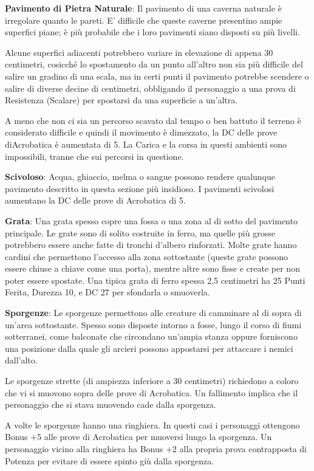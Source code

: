 \documentclass[a4paper,11pt,twoside,openany]{book}
\begin{document}
\textbf{Pavimento di Pietra Naturale}: Il pavimento di una caverna naturale è irregolare quanto le pareti. E' difficile che queste caverne presentino ampie superfici piane; è più probabile che i loro pavimenti siano disposti su più livelli.

Alcune superfici adiacenti potrebbero variare in elevazione di appena 30 centimetri, cosicché lo spostamento da un punto all'altro non sia più difficile del salire un gradino di una scala, ma in certi punti il pavimento potrebbe scendere o salire di diverse decine di centimetri, obbligando il personaggio a una prova di Resistenza (Scalare) per spostarsi da una superficie a un'altra.

A meno che non ci sia un percorso scavato dal tempo o ben battuto il terreno è considerato difficile e quindi il movimento è dimezzato, la DC delle prove diAcrobatica è aumentata di 5. La Carica e la corsa in questi ambienti sono impossibili, tranne che sui percorsi in questione.

\textbf{Scivoloso}: Acqua, ghiaccio, melma o sangue possono rendere qualunque pavimento descritto in questa sezione più insidioso. I pavimenti scivolosi aumentano la DC delle prove di Acrobatica di 5.

\textbf{Grata}: Una grata spesso copre una fossa o una zona al di sotto del pavimento principale. Le grate sono di solito costruite in ferro, ma quelle più grosse potrebbero essere anche fatte di tronchi d’albero rinforzati. Molte grate hanno cardini che permettono l’accesso alla zona sottostante (queste grate possono essere chiuse a chiave come una porta), mentre altre sono fisse e create per non poter essere spostate. Una tipica grata di ferro spessa 2,5 centimetri ha 25 Punti Ferita, Durezza 10, e DC 27 per sfondarla o smuoverla.

\textbf{Sporgenze}: Le sporgenze permettono alle creature di camminare al di sopra di un'area sottostante. Spesso sono disposte intorno a fosse, lungo il corso di fiumi sotterranei, come balconate che circondano un'ampia stanza oppure forniscono una posizione dalla quale gli arcieri possono appostarsi per attaccare i nemici dall'alto.

Le sporgenze strette (di ampiezza inferiore a 30 centimetri) richiedono a coloro che vi si muovono sopra delle prove di Acrobatica. Un fallimento implica che il personaggio che si stava muovendo cade dalla sporgenza.

A volte le sporgenze hanno una ringhiera. In questi casi i personaggi ottengono Bonus +5 alle prove di Acrobatica per muoversi lungo la sporgenza. Un personaggio vicino alla ringhiera ha Bonus +2 alla propria prova contrapposta di Potenza per evitare di essere spinto giù dalla sporgenza.
\end{document}
